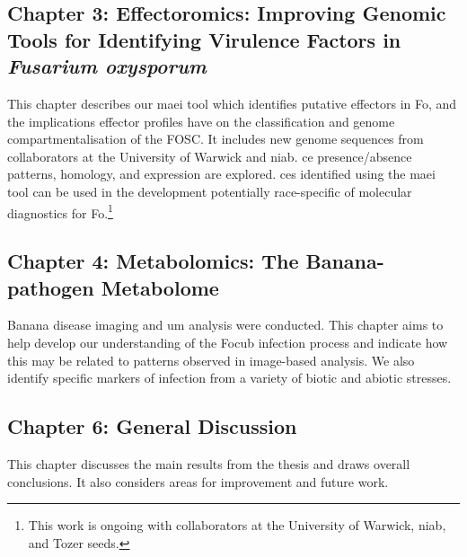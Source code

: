 \subsection{Chapter 3: Effectoromics: Improving Genomic Tools for Identifying Virulence Factors in \textit{Fusarium oxysporum}} 

This chapter describes our \acf{maei} tool which identifies putative effectors in \acl{Fo}, and the implications effector profiles have on the classification and genome compartmentalisation of the FOSC. It includes new genome sequences from collaborators at the University of Warwick and \ac{niab}. \Acl{ce} presence/absence patterns, homology, and expression are explored. \Acp{ce} identified using the \ac{maei} tool can be used in the development potentially race-specific of molecular diagnostics for \acl{Fo}.\footnote{This work is ongoing with collaborators at the University of Warwick, \ac{niab}, and Tozer seeds.} 

\subsection{Chapter 4: Metabolomics: The Banana-pathogen Metabolome}

Banana disease imaging and \acl{um} analysis were conducted. This chapter
aims to help develop our understanding of the \acl{Focub} infection process and indicate how this may be related to patterns observed in image-based analysis. We also identify specific markers of infection from a variety of biotic and abiotic stresses. 

\subsection{Chapter 6: General Discussion}
This chapter discusses the main results from the thesis and draws overall conclusions. It also considers areas for improvement and future work. 


 

 



 



 



 